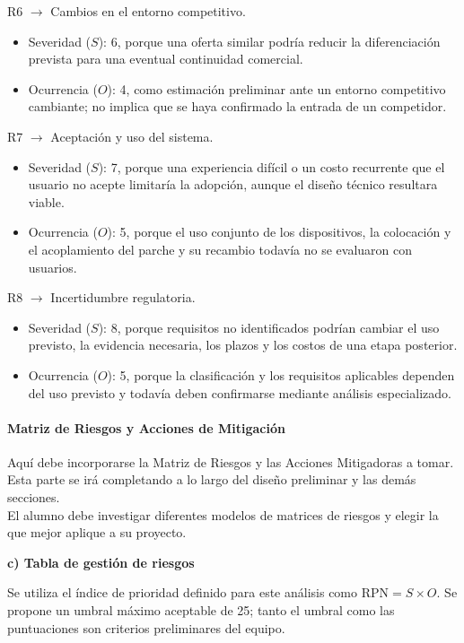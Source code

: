 \noindent R6 $\rightarrow$ Cambios en el entorno competitivo.
\begin{itemize}
    \item Severidad ($S$): 6, porque una oferta similar podría reducir la diferenciación prevista para una eventual continuidad comercial.
    \item Ocurrencia ($O$): 4, como estimación preliminar ante un entorno competitivo cambiante; no implica que se haya confirmado la entrada de un competidor.
\end{itemize}

\noindent R7 $\rightarrow$ Aceptación y uso del sistema.
\begin{itemize}
    \item Severidad ($S$): 7, porque una experiencia difícil o un costo recurrente que el usuario no acepte limitaría la adopción, aunque el diseño técnico resultara viable.
    \item Ocurrencia ($O$): 5, porque el uso conjunto de los dispositivos, la colocación y el acoplamiento del parche y su recambio todavía no se evaluaron con usuarios.
\end{itemize}

\noindent R8 $\rightarrow$ Incertidumbre regulatoria.
\begin{itemize}
    \item Severidad ($S$): 8, porque requisitos no identificados podrían cambiar el uso previsto, la evidencia necesaria, los plazos y los costos de una etapa posterior.
    \item Ocurrencia ($O$): 5, porque la clasificación y los requisitos aplicables dependen del uso previsto y todavía deben confirmarse mediante análisis especializado.
\end{itemize}

    \paragraph{Matriz de Riesgos y Acciones de Mitigación}
    {\consigna
    Aquí debe incorporarse la Matriz de Riesgos y las Acciones Mitigadoras a tomar.\\
    Esta parte se irá completando a lo largo del diseño preliminar y las demás secciones.\\
    El alumno debe investigar diferentes modelos de matrices de riesgos y elegir la que mejor aplique a su proyecto.
    }

\noindent\textbf{c) Tabla de gestión de riesgos}

Se utiliza el índice de prioridad definido para este análisis como $\mathrm{RPN} = S \times O$. Se propone un umbral máximo aceptable de 25; tanto el umbral como las puntuaciones son criterios preliminares del equipo.

